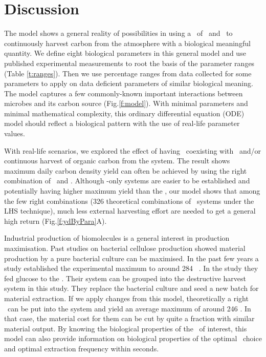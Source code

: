 \documentclass[../thesis.tex]{subfiles} %
\begin{document}
\section{Discussion}
The model shows a general reality of possibilities in using a \pbs\ of \bac\ and \phy\ to continuously harvest carbon from the atmosphere with a biological meaningful quantity.  We define eight biological parameters in this general model and use published experimental measurements to root the basis of the parameter ranges (Table \ref{t:ranges}).  Then we use percentage ranges from data collected for some parameters to apply on data deficient parameters of similar biological meaning.  The model captures a few commonly-known important interactions between microbes and its carbon source (Fig.\ref{f:model}).  With minimal parameters and minimal mathematical complexity, this ordinary differential equation (ODE) model should reflect a biological pattern with the use of real-life parameter values.

With real-life scenarios, we explored the effect of having \bac\ coexisting with \phy\ and/or continuous harvest of organic carbon from the system.  The result shows maximum daily carbon density yield can often be achieved by using the right combination of \phy\ and \bac.  Although \phy-only systems are easier to be established and potentially having higher maximum yield than the \pbs, our model shows that among the few right combinations (326 theoretical combinations of \PBH\ systems under the LHS technique), much less external harvesting effort are needed to get a general high return (Fig.\ref{f:ydByPara}A).

Industrial production of biomolecules is a general interest in production maximisation.  Past studies on bacterial cellulose production showed material production by a pure bacterial culture can be maximised.  In the past few years a study established the experimental maximum to around 284 \dxdt\ \autocite{aytekin2016statistical}.  In the study they fed glucose to the \bac.  Their system can be grouped into the destructive harvest system in this study.  They replace the bacterial culture and seed a new batch for material extraction.  If we apply changes from this model, theoretically a right \phy\ can be put into the system and yield an average maximum of around 246 \dxdt.  In that case, the material cost for them can be cut by quite a fraction with similar material output.  By knowing the biological properties of the \bac\ of interest, this model can also provide information on biological properties of the optimal \phy\ choice and optimal extraction frequency within seconds.
\end{document}
